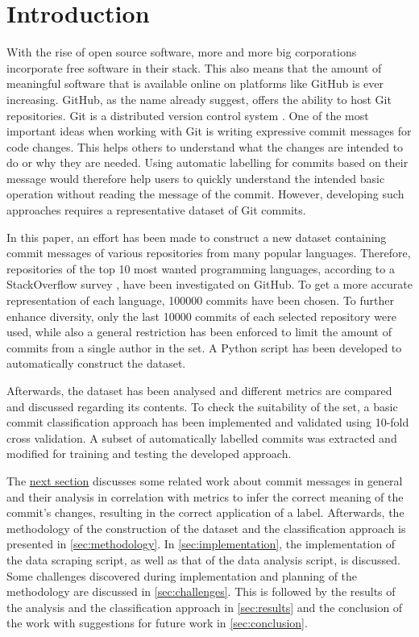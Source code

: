 \section{Introduction}
\label{sec:introduction}

With the rise of open source software, more and more big corporations
incorporate free software in their stack. This also means that the amount of
meaningful software that is available online on platforms like GitHub
\cite{github} is ever increasing. GitHub, as the name already suggest, offers
the ability to host Git repositories. Git is a distributed version control
system \cite{git}. One of the most important ideas when working with Git
is writing expressive commit messages for code changes. This helps others
to understand what the changes are intended to do or why they are needed.
Using automatic labelling for commits based on their message would therefore
help users to quickly understand the intended basic operation without reading
the message of the commit. However, developing such approaches requires a
representative dataset of Git commits.

In this paper, an effort has been made to construct a new dataset containing
commit messages of various repositories from many popular languages. Therefore,
repositories of the top 10 most wanted programming languages, according to
a StackOverflow survey \cite{so-survey}, have been investigated on GitHub. To get a more accurate
representation of each language, 100000 commits have been chosen. To further
enhance diversity, only the last 10000 commits of each selected repository
were used, while also a general restriction has been enforced to limit the
amount of commits from a single author in the set. A Python script has been
developed to automatically construct the dataset.

Afterwards, the dataset has been analysed and different metrics are
compared and discussed regarding its contents. To check the
suitability of the set, a basic commit classification approach has been
implemented and validated using 10-fold cross validation. A subset of
automatically labelled commits was extracted and modified for training and
testing the developed approach.

The \hyperref[sec:related-work]{next section} discusses some related work about commit messages in
general and their analysis in correlation with metrics to infer the
correct meaning of the commit's changes, resulting in the correct application
of a label. Afterwards, the methodology of the
construction of the dataset and the classification approach is presented
in \autoref{sec:methodology}. In \autoref{sec:implementation}, the
implementation of the data scraping script, as well as that of the data analysis
script, is discussed. Some challenges discovered during implementation and
planning of the methodology are discussed in \autoref{sec:challenges}.
This is followed by the results of the analysis and
the classification approach in \autoref{sec:results} and the conclusion of the
work with suggestions for future work in \autoref{sec:conclusion}.

